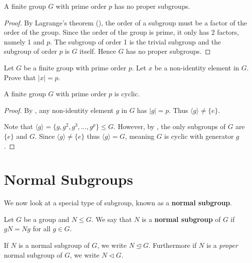\begin{corollary}\label{corollary-group-with-prime-order-subgroups}
    A finite group $G$ with prime order $p$ has no proper subgroups.
\end{corollary}
\begin{proof}
    By Lagrange's theorem (), the order of a subgroup must be a factor of the order of the group. Since the order of the group is prime, it only has 2 factors, namely 1 and $p$. The subgroup of order 1 is the trivial subgroup and the subgroup of order $p$ is $G$ itself. Hence $G$ has no proper subgroups.
\end{proof}

\begin{exercise}\label{exercise-prime-order-element}
    Let $G$ be a finite group with prime order $p$. Let $x$ be a non-identity element in $G$. Prove that $|x| = p$.
\end{exercise}

\begin{corollary}\label{corollary-group-with-prime-order-is-cyclic}
    A finite group $G$ with prime order $p$ is cyclic.
\end{corollary}
\begin{proof}
    By , any non-identity element $g$ in $G$ has $|g| = p$. Thus $\langle g \rangle \neq \{e\}$.

    Note that $\langle g \rangle = \{g, g^2, g^3, \dots, g^p\} \leq G$. However, by , the only subgroups of $G$ are $\{e\}$ and $G$. Since $\langle g \rangle \neq \{e\}$ thus $\langle g \rangle = G$, meaning $G$ is cyclic with generator $g$.
\end{proof}

\section{Normal Subgroups}
We now look at a special type of subgroup, known as a \textbf{normal subgroup}.
\begin{definition}
    Let $G$ be a group and $N \leq G$. We say that $N$ is a \textbf{normal subgroup} of $G$ if $gN = Ng$ for all $g \in G$.
\end{definition}
If $N$ is a normal subgroup of $G$, we write $N \unlhd G$. Furthermore if $N$ is a \textit{proper} normal subgroup of $G$, we write $N \lhd G$.

\newpage

